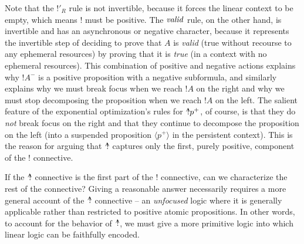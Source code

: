 Note that the ${!}'_R$ rule is not invertible,
because it forces the linear context to be empty, which means ${!}$
must be positive. The ${\it valid}$
rule, on the other hand, is invertible and has an
asynchronous or negative character,
because it represents the invertible step of deciding to prove that
$A$ is {\it valid} (true without recourse to any ephemeral resources)
by proving that it is {\it true}
(in a context with no ephemeral resources). This combination of
positive and negative actions explains why ${!}A^-$ is a positive
proposition with a negative subformula, and similarly explains why we
must break focus when we reach ${!}A$ on the right and why we must
stop decomposing the proposition when we reach ${!}A$ on the left.
The salient feature of the exponential optimization's rules for ${\mbox{\hspace{2pt}$\mathbb !$\hspace{-4.44pt}$^\wedge$\hspace{-1pt}}}p^+$, of
course, is that they do {\it not} break focus on the right and that
they continue to decompose the proposition on the left (into a
suspended proposition $\langle p^+ \rangle$ in the persistent
context). This is the reason for arguing that ${\mbox{\hspace{2pt}$\mathbb !$\hspace{-4.44pt}$^\wedge$\hspace{-1pt}}}$ captures only
the first, purely positive, component of the ${!}$ connective.

If the $\mbox{\hspace{2pt}$\mathbb !$\hspace{-4.44pt}$^\wedge$\hspace{-1pt}}$ connective is the first part of the $!$ connective,
can we characterize the rest of the connective? Giving a reasonable
answer necessarily requires a more general account of the $\mbox{\hspace{2pt}$\mathbb !$\hspace{-4.44pt}$^\wedge$\hspace{-1pt}}$
connective -- an {\it unfocused} logic where it is generally applicable
rather than restricted to positive atomic propositions. In other
words, to account for the behavior of $\mbox{\hspace{2pt}$\mathbb !$\hspace{-4.44pt}$^\wedge$\hspace{-1pt}}$, we must give a more
primitive logic into which linear logic can be faithfully encoded.



